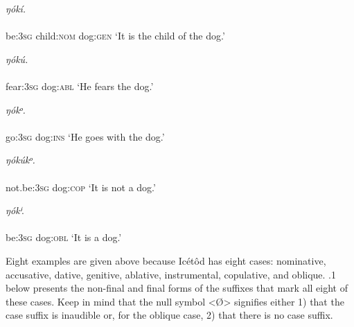 \ea\label{ex:}
     \textit{ŋókí.} \\
    \\
be:\textsc{3sg}   child:\textsc{nom}   dog:\textsc{gen}
\glt ‘It is the child of the dog.’ 
\z




\ea\label{ex:}
     \textit{ŋókú.} \\
    \\
fear:\textsc{3sg}   dog:\textsc{abl}
\glt ‘He fears the dog.’ 
\z




\ea\label{ex:}
     \textit{ŋókᵒ.} \\
    \\
go:\textsc{3sg}  dog:\textsc{ins}
\glt ‘He goes with the dog.’ 
\z




\ea\label{ex:}
     \textit{ŋókúkᵒ.} \\
    \\
not.be:\textsc{3sg}  dog:\textsc{cop}
\glt ‘It is not a dog.’ 
\z




\ea\label{ex:}
     \textit{ŋók}\textit{ⁱ}. \\
    \\
be:\textsc{3sg}  dog:\textsc{obl}
\glt ‘It is a dog.’ 
\z


Eight examples are given above because Icétôd has eight cases: nominative, accusative, dative, genitive, ablative, instrumental, copulative, and oblique. .1 below presents the non-final and final forms of the suffixes that mark all eight of these cases. Keep in mind that the null symbol <Ø> signifies either 1) that the case suffix is inaudible or, for the oblique case, 2) that there is no case suffix. 


